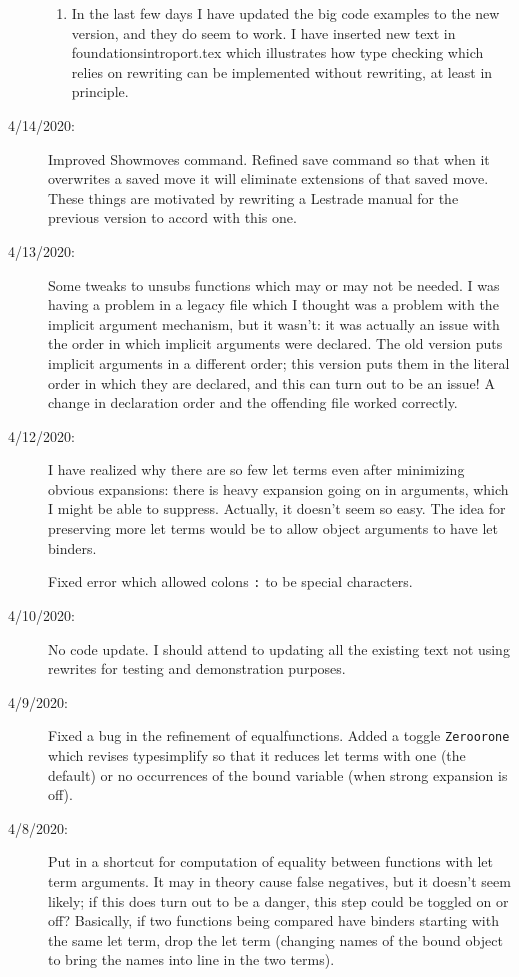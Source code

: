 \documentclass[12pt]{article}
\begin{document}
\begin{description}
\begin{enumerate}
\item In the last few days I have updated the big code examples to the new version, and they do seem to work.   I have inserted new text in foundationsintroport.tex which illustrates
how type checking which relies on rewriting can be implemented without rewriting, at least in principle.

\end{enumerate}

\item[4/14/2020:]  Improved Showmoves command.  Refined save command so that when it overwrites a saved move
it will eliminate extensions of that saved move.  These things are motivated by rewriting a Lestrade manual for the previous version to accord with this one.

\item[4/13/2020:]  Some tweaks to unsubs functions which may or may not be needed.  I was having a problem in a legacy file which I thought was a problem with the implicit argument mechanism, but it wasn't:  it was actually an issue with the order in which implicit arguments were declared.  The old version puts implicit arguments in a different order;  this version puts them in the literal order in which they are declared, and this can turn out to be an issue!  A change in declaration order and the offending file worked correctly.

\item[4/12/2020:]  I have realized why there are so few let terms even after minimizing obvious expansions:  there is heavy expansion going on in arguments, which I might be able to suppress.  Actually, it doesn't seem so easy.  The idea for preserving more let terms would be to allow object arguments to have let binders.

Fixed error which allowed colons \verb|:| to be special characters.

\item[4/10/2020:]  No code update.  I should attend to updating all the existing text not using rewrites for testing and demonstration purposes.

\item[4/9/2020:]  Fixed a bug in the refinement of equalfunctions.  Added a toggle {\tt Zeroorone}
which revises typesimplify so that it reduces let terms with one (the default) or no occurrences of the bound variable (when strong expansion is off).

\item[4/8/2020:]  Put in a shortcut for computation of equality between functions with let term arguments.
It may in theory cause false negatives, but it doesn't seem likely;  if this does turn out to be a danger,
this step could be toggled on or off?   Basically, if two functions being compared have binders starting with
the same let term, drop the let term (changing names of the bound object to bring the names into line in the
two terms).


\end{description}
\end{document}
